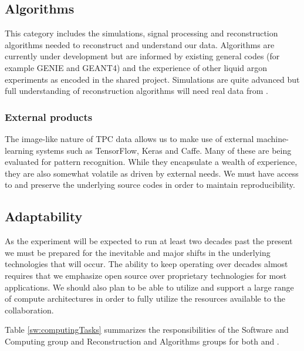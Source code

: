 \subsection{Algorithms}
This category includes the simulations, signal processing and reconstruction algorithms needed to reconstruct and understand our data. Algorithms are currently under development but are  informed by existing general codes (for example GENIE and GEANT4) and the experience of other liquid argon experiments as encoded in the shared   project.  Simulations are quite advanced but full understanding of reconstruction algorithms will need real data from . 

\subsubsection{External products}
The image-like nature of TPC data allows us to make use of external machine-learning systems such as TensorFlow\cite{DBLP:journals/corr/AbadiABBCCCDDDG16}, 
Keras\cite{chollet2015keras} and Caffe\cite{Jia:2014:CCA:2647868.2654889}.  Many of these are being evaluated for pattern recognition. While they encapsulate a wealth of experience, they are also somewhat volatile as driven by external needs.  We must have access to and preserve the underlying source codes in order to maintain reproducibility. 



\subsection{Adaptability}
As the experiment will be expected to run at least two decades past the present we must be prepared for the inevitable and major shifts in the underlying technologies that will occur. The ability to keep operating over decades almost requires that we emphasize open source over proprietary technologies for most applications.  We should also plan to be able to utilize and support a large range of compute architectures in order to fully utilize the resources available to the collaboration.

Table \ref{sw:computingTasks} summarizes the responsibilities of the Software and Computing group and Reconstruction and Algorithms groups for both  and .

